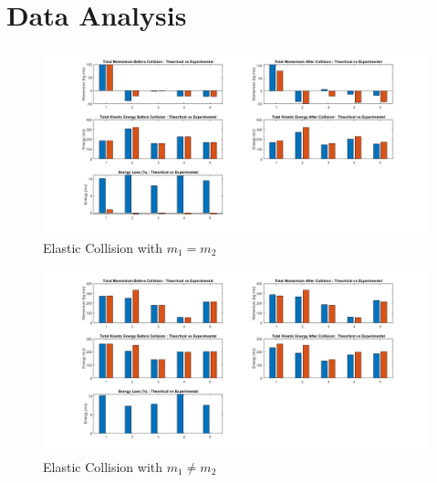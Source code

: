 \section{Data Analysis}
\newpage
\begin{figure}[h!]
    \centering
    \includegraphics[width=\textwidth]{figures/Exp1.png}
    \caption{Elastic Collision with $m_1 = m_2$}
    \label{fig:yx}
\end{figure}

\newpage
\begin{figure}[h!]
    \centering
    \includegraphics[width=\textwidth]{figures/Exp2.png}
    \caption{Elastic Collision with $m_1 \neq m_2$}
    \label{fig:yx}
\end{figure}

